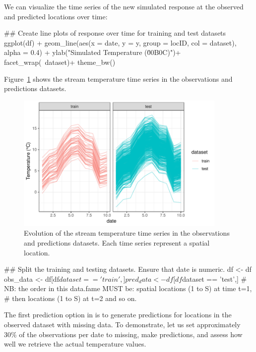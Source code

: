 We can visualize the time series of the new simulated response at the observed and predicted locations over time:
\begin{example}
## Create line plots of response over time for training and test datasets
ggplot(df) +
  geom_line(aes(x = date, y = y, group = locID, col = dataset), alpha = 0.4) +
  ylab("Simulated Temperature (\u00B0C)")+
  facet_wrap(~dataset)+
  theme_bw()
\end{example}

Figure~\ref{figure:1time_series} shows the stream temperature time series in the observations and predictions datasets.

\begin{figure}[htbp]
  \centering
   \includegraphics[width=4.0in]{./Figs/1time_series.pdf}
  \caption{Evolution of the stream temperature time series in the observations and predictions datasets. Each time series represent a spatial location.}
  \label{figure:1time_series}
\end{figure}



\begin{example}
## Split the training and testing datasets. Ensure that date is numeric.
df <- df %
obs_data <- df[df$dataset == 'train',]
pred_data <- df[df$dataset == 'test',]
# NB: the order in this data.fame MUST be: spatial locations (1 to S) at time t=1, 
# then locations (1 to S) at t=2 and so on.

\end{example}


The first prediction option in  is to generate predictions for locations in the observed dataset with missing data. To demonstrate, let us set approximately 30\% of the observations per date to missing, make predictions, and assess how well we retrieve the actual temperature values. 

